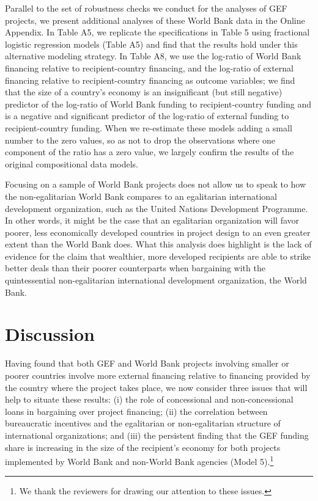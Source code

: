 \documentclass{article}
\begin{document}
Parallel to the set of robustness checks we conduct for the analyses of GEF projects, we present additional analyses of these World Bank data in the Online Appendix. In Table A5, we replicate the specifications in Table 5 using fractional logistic regression models (Table A5) and find that the results hold under this alternative modeling strategy. In Table A8, we use the log-ratio of World Bank financing relative to recipient-country financing, and the log-ratio of external financing relative to recipient-country financing as outcome variables; we find that the size of a country’s economy is an insignificant (but still negative) predictor of the log-ratio of World Bank funding to recipient-country funding and is a negative and significant predictor of the log-ratio of external funding to recipient-country funding. When we re-estimate these models adding a small number to the zero values, so as not to drop the observations where one component of the ratio has a zero value, we largely confirm the results of the original compositional data models.
   
Focusing on a sample of World Bank projects does not allow us to speak to how the non-egalitarian World Bank compares to an egalitarian international development organization, such as the United Nations Development Programme.  In other words, it might be the case that an egalitarian organization will favor poorer, less economically developed countries in project design to an even greater extent than the World Bank does.  What this analysis does highlight is the lack of evidence for the claim that wealthier, more developed recipients are able to strike better deals than their poorer counterparts when bargaining with the quintessential non-egalitarian international development organization, the World Bank.    

\section{Discussion}
Having found that both GEF and World Bank projects involving smaller or poorer countries involve more external financing relative to financing provided by the country where the project takes place, we now consider three issues that will help to situate these results: (i) the role of concessional and non-concessional loans in bargaining over project financing; (ii) the correlation between bureaucratic incentives and the egalitarian or non-egalitarian structure of international organizations; and (iii) the persistent finding that the GEF funding share is increasing in the size of the recipient’s economy for both projects implemented by World Bank and non-World Bank agencies (Model 5).\footnote{We thank the reviewers for drawing our attention to these issues.}
  
\end{document}

